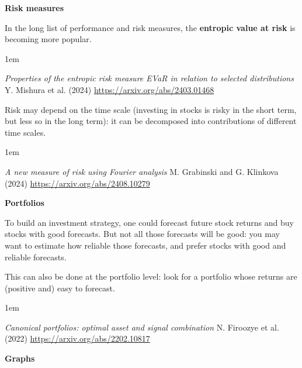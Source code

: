 \documentclass[a5paper]{article}
\let\d\textbf
\newenvironment{reference}{%
  \medskip\goodbreak
  \parskip 0pt
  \raggedright
  \leftskip 1em
  \obeylines
}{\par\medskip\goodbreak}
\def\section#1{\clearpage{\vspace*{0cm}\LARGE\centering\bfseries #1\par\bigskip\bigskip}}
\def\subsection#1{{\par\bigskip\goodbreak\large\bfseries #1\par}}
\begin{document}
\subsection{Risk measures}

In the long list of performance and risk measures, the \d{entropic value at risk}
is becoming more popular.

\begin{reference}
  \emph{Properties of the entropic risk measure EVaR in relation to selected distributions}
  Y. Mishura et al. (2024)
  \url{https://arxiv.org/abs/2403.01468}
\end{reference}

Risk may depend on the time scale (investing in stocks is risky in the short term,
but less so in the long term): it can be decomposed into contributions of different
time scales.

\begin{reference}
  \emph{A new measure of risk using Fourier analysis}
  M. Grabinski and G. Klinkova (2024)
  \url{https://arxiv.org/abs/2408.10279}
\end{reference}

\subsection{Portfolios}

To build an investment strategy, one could forecast future stock returns
and buy stocks with good forecasts. But not all those forecasts will be good:
you may want to estimate how reliable those forecasts,
and prefer stocks with good and reliable forecasts.

This can also be done at the portfolio level: 
look for a portfolio whose returns are (positive and) easy to forecast. 

\begin{reference}
  \emph{Canonical portfolios: optimal asset and signal combination}
  N. Firoozye et al. (2022)
  \url{https://arxiv.org/abs/2202.10817}
\end{reference}

\section{Other topics}

\subsection{Graphs}
\end{document}
